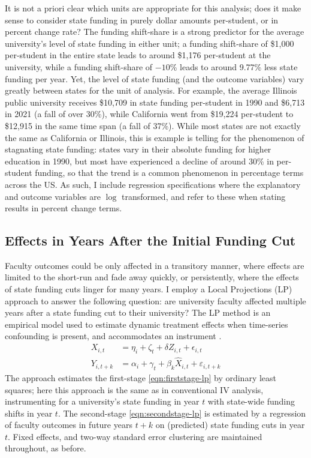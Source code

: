 It is not a priori clear which units are appropriate for this analysis;
does it make sense to consider state funding in purely dollar amounts per-student, or in percent change rate?
The funding shift-share is a strong predictor for the average university's level of state funding in either unit; a funding shift-share of \$1,000 per-student in the entire state leads to around \$1,176 per-student at the university, while a funding shift-share of $-10$\% leads to around 9.77\% less state funding per year.
Yet, the level of state funding (and the outcome variables) vary greatly between states for the unit of analysis.
For example, the average Illinois public university receives \$10,709 in state funding per-student in 1990 and  \$6,713 in 2021 (a fall of over 30\%), while California went from \$19,224 per-student to \$12,915 in the same time span (a fall of 37\%).
While most states are not exactly the same as California or Illinois, this is example is telling for the phenomenon of stagnating state funding:
states vary in their absolute funding for higher education in 1990, but most have experienced a decline of around 30\% in per-student funding, so that the trend is a common phenomenon in percentage terms across the US.
As such, I include regression specifications where the explanatory and outcome variables are $\log$ transformed, and refer to these when stating results in percent change terms.

\subsection{Effects in Years After the Initial Funding Cut}
\label{sec:local-projections}
Faculty outcomes could be only affected in a transitory manner, where effects are limited to the short-run and fade away quickly, or persistently, where the effects of state funding cuts linger for many years.
I employ a Local Projections (LP) approach to answer the following question: are university faculty affected multiple years after a state funding cut to their university?
The LP method is an empirical model used to estimate dynamic treatment effects when time-series confounding is present, and accommodates an instrument \citep{jorda2005,olea2021inference}.
\begin{align}
    \label{eqn:firststage-lp}
    X_{i,t}   &= \eta_i + \zeta_t + \delta Z_{i,t} + \epsilon_{i,t} \\
    \label{eqn:secondstage-lp}
    Y_{i,t+k} &= \alpha_i + \gamma_t + \beta_k \widehat X_{i,t} + \varepsilon_{i,t+k}
\end{align}
The approach estimates the first-stage \eqref{eqn:firststage-lp} by ordinary least squares; here this approach is the same as in conventional IV analysis, instrumenting for a university's state funding in year $t$ with state-wide funding shifts in year $t$.
The second-stage \eqref{eqn:secondstage-lp} is estimated by a regression of 
faculty outcomes in future years $t+k$ on (predicted) state funding cuts in year $t$.
Fixed effects, and two-way standard error clustering are maintained throughout, as before.

